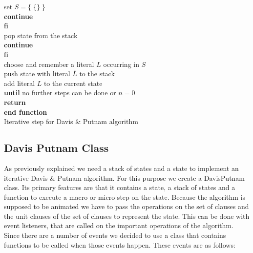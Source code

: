 \begin{listing}[h!]
                    \hspace*{2cm} set $S = \{\;\{\}\;\}$\\
                    \hspace*{2cm} \textbf{continue}\\
                \hspace*{1.5cm} \textbf{fi}\\
                \hspace*{1.5cm} pop state from the stack\\
                \hspace*{1.5cm} \textbf{continue}\\
            \hspace*{1.0cm} \textbf{fi}\\
            \hspace*{1.0cm} choose and remember a literal $L$ occurring in $S$\\
            \hspace*{1.0cm} push state with literal $\bar{L}$ to the stack\\
            \hspace*{1.0cm} add literal $L$ to the current state\\
        \hspace*{0.5cm} \textbf{until} no further steps can be done or $n = 0$\\
        \hspace*{0.5cm} \textbf{return}\\
    \textbf{end function}\\
    \caption{Iterative step for Davis \& Putnam algorithm}
    \label{code:stepDavisPutnam}
\end{listing}

\subsection{Davis Putnam Class}
\label{sub:impDavisPutnam}
As previously explained we need a stack of states and a state to implement an iterative Davis \& Putnam algorithm. For this purpose we create a DavisPutnam class. Its primary features are that it contains a state, a stack of states and a function to execute a macro or micro step on the state. Because the algorithm is supposed to be animated we have to pass the operations on the set of clauses and the unit clauses of the set of clauses to represent the state. This can be done with event listeners, that are called on the important operations of the algorithm. Since there are a number of events we decided to use a class that contains functions to be called when those events happen. These events are as follows:

